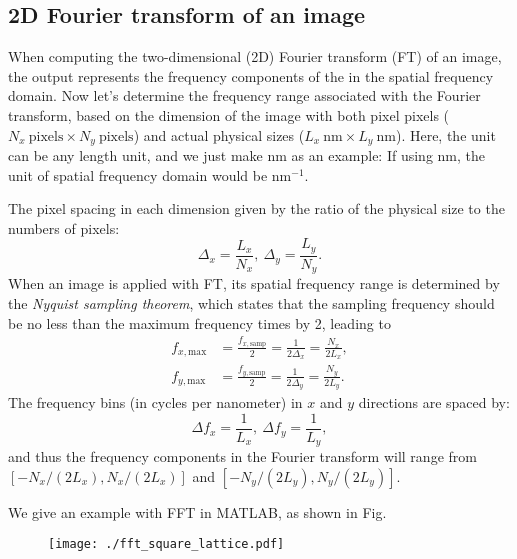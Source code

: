 \documentclass[pra,superscriptaddress,reprint]{revtex4-1}
\begin{document}
\subsection{2D Fourier transform of an image~\label{appx-a2:2dft}}

When computing the two-dimensional (2D) Fourier transform (FT) of an image, the output represents the frequency
components of the  in the spatial frequency domain.
Now let's determine the frequency range associated with the Fourier transform, based on the dimension of the image
with both pixel pixels ($N_x~\text{pixels}\times N_y~\text{pixels}$) 
and actual physical sizes ($L_x~\text{nm}\times L_y~\text{nm}$).
Here, the unit can be any length unit, and we just make nm as an example: 
If using nm, the unit of spatial frequency domain would be nm$^{-1}$.

The pixel spacing in each dimension given by the ratio of the physical size to the numbers of pixels:
\begin{equation}
\Delta_x = \frac{L_x}{N_x},~\Delta_y = \frac{L_y}{N_y}.
\end{equation}
When  an image is applied with FT, its spatial frequency range is determined by the \textit{Nyquist sampling theorem},
which states that the sampling frequency should be no less than the maximum frequency times by 2, leading to
\begin{subequations}
\begin{align}
f_{x,\text{max}} &= \frac{f_{x,\text{samp}}}{2} = \frac{1}{2\Delta_x} = \frac{N_x}{2L_x}, \\
f_{y,\text{max}} &= \frac{f_{y,\text{samp}}}{2} = \frac{1}{2\Delta_y} = \frac{N_y}{2L_y}.
\end{align}
\end{subequations}
The frequency bins (in cycles per nanometer) in $x$ and $y$ directions are spaced by:
\begin{equation}
\Delta f_x = \frac{1}{L_x},~\Delta f_y = \frac{1}{L_y},
\end{equation}
and thus the frequency components in the Fourier transform will range from 
$[-N_x/(2L_x), N_x/(2L_x)]$ and $[-N_y/(2L_y), N_y/(2L_y)]$.

We give an example with FFT in MATLAB, as shown in Fig.

\begin{figure}[t]
\centering
\texttt{[image: ./fft\_square\_lattice.pdf]}\\
\caption{\label{fig:square_lattice}}
\end{figure}
\end{document}
